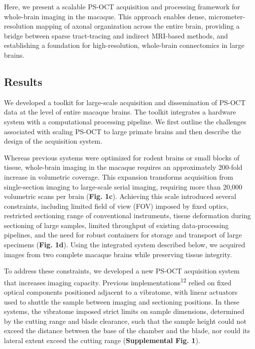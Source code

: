 \documentclass{article}
\begin{document}
Here, we present a scalable PS-OCT acquisition and processing framework for whole-brain imaging in the macaque. This approach enables dense, micrometer-resolution mapping of axonal organization across the entire brain, providing a bridge between sparse tract-tracing and indirect MRI-based methods, and establishing a foundation for high-resolution, whole-brain connectomics in large brains.

\subsection*{Results}

We developed a toolkit for large-scale acquisition and dissemination of PS-OCT data at the level of entire macaque brains. The toolkit integrates a hardware system with a computational processing pipeline. We first outline the challenges associated with scaling PS-OCT to large primate brains and then describe the design of the acquisition system.

Whereas previous systems were optimized for rodent brains or small blocks of tissue, whole-brain imaging in the macaque requires an approximately 200-fold increase in volumetric coverage. This expansion transforms acquisition from single-section imaging to large-scale serial imaging, requiring more than 20,000 volumetric scans per brain (\textbf{Fig. 1c}). Achieving this scale introduced several constraints, including limited field of view (FOV) imposed by fixed optics, restricted sectioning range of conventional instruments, tissue deformation during sectioning of large samples, limited throughput of existing data-processing pipelines, and the need for robust containers for storage and transport of large specimens (\textbf{Fig. 1d}). Using the integrated system described below, we acquired images from two complete macaque brains while preserving tissue integrity.

To address these constraints, we developed a new PS-OCT acquisition system that increases imaging capacity. Previous implementations\textsuperscript{12} relied on fixed optical components positioned adjacent to a vibratome, with linear actuators used to shuttle the sample between imaging and sectioning positions. In these systems, the vibratome imposed strict limits on sample dimensions, determined by the cutting range and blade clearance, such that the sample height could not exceed the distance between the base of the chamber and the blade, nor could its lateral extent exceed the cutting range (\textbf{Supplemental Fig. 1}).
\end{document}
